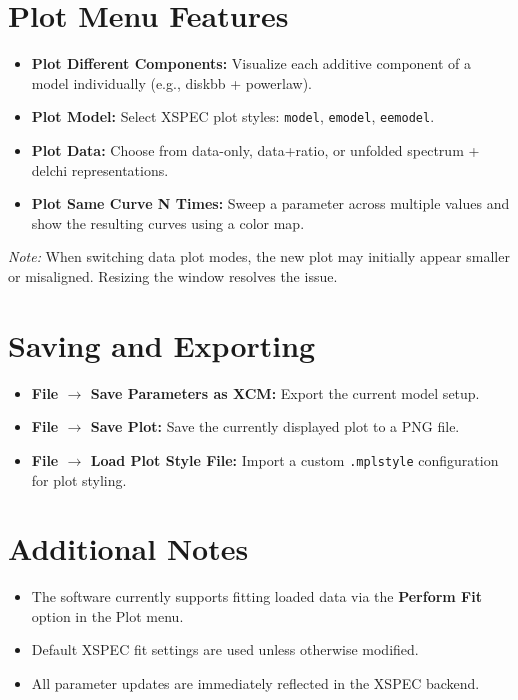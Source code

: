 \documentclass[11pt]{article}
\begin{document}
\section*{Plot Menu Features}

\begin{itemize}
    \item \textbf{Plot Different Components:} Visualize each additive component of a model individually (e.g., diskbb + powerlaw).
    \item \textbf{Plot Model:} Select XSPEC plot styles: \texttt{model}, \texttt{emodel}, \texttt{eemodel}.
    \item \textbf{Plot Data:} Choose from data-only, data+ratio, or unfolded spectrum + delchi representations.
    \item \textbf{Plot Same Curve N Times:} Sweep a parameter across multiple values and show the resulting curves using a color map.
\end{itemize}

\noindent
\textit{Note:} When switching data plot modes, the new plot may initially appear smaller or misaligned. Resizing the window resolves the issue.

\section*{Saving and Exporting}

\begin{itemize}
    \item \textbf{File $\rightarrow$ Save Parameters as XCM:} Export the current model setup.
    \item \textbf{File $\rightarrow$ Save Plot:} Save the currently displayed plot to a PNG file.
    \item \textbf{File $\rightarrow$ Load Plot Style File:} Import a custom \texttt{.mplstyle} configuration for plot styling.
\end{itemize}

\section*{Additional Notes}

\begin{itemize}
    \item The software currently supports fitting loaded data via the \textbf{Perform Fit} option in the Plot menu.
    \item Default XSPEC fit settings are used unless otherwise modified.
    \item All parameter updates are immediately reflected in the XSPEC backend.
\end{itemize}
\end{document}
